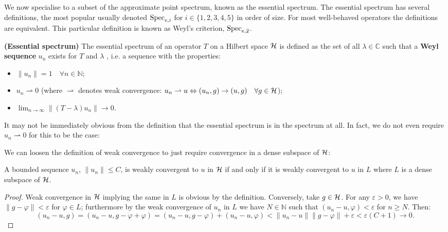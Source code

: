 \documentclass[../main.tex]{subfiles}
\begin{document}
We now specialise to a subset of the approximate point spectrum, known as the essential spectrum.
The essential spectrum has several definitions, 
the most popular usually denoted $\mathrm{Spec}_{e,i}$ for $i \in \{1,2,3,4,5\}$ in order of size. For 
most well-behaved operators the definitions are equivalent. This particular definition 
is known as Weyl's criterion, $\mathrm{Spec}_{e, 2}$. \cite{edmunds2018spectral}

\begin{definition}{\textbf{(Essential spectrum)}}
The essential spectrum of an operator $T$ on a Hilbert space $\mathcal{H}$ 
is defined as the set of all $\lambda \in \mathbb{C}$ such that a \textbf{Weyl sequence} $u_n$ exists for $T$ and $\lambda$ , i.e. a sequence with the properties:
\begin{itemize}
\item $\|u_n\| = 1\quad \forall n \in \mathbb{N}$;
\item $u_n \rightharpoonup 0$ (where $\rightharpoonup$ denotes weak convergence: $u_n \rightharpoonup u \Leftrightarrow (u_n, g) \rightarrow (u, g) \quad \forall g \in \mathcal{H}$);
\item $\lim_{n \rightarrow \infty}\|(T - \lambda)u_n\|  \rightarrow 0$.
\end{itemize}
\end{definition}

It may not be immediately obvious from the definition that the essential spectrum is in the spectrum at all. In fact, we do not even require $u_n \rightharpoonup 0$ for this to be the case:



We can loosen the definition of weak convergence to just require convergence in a dense subspace of $\mathcal{H}$:
\begin{lemma}\label{thm:weak-conv-dense-subset}
A bounded sequence $u_n$, $\|u_n\| \leq C$, is weakly convergent to $u$ in $\mathcal{H}$ if and only if it is weakly convergent to $u$ in $L$ where $L$ is a dense subspace of $\mathcal{H}$.
\end{lemma}
\begin{proof}
Weak convergence in $\mathcal{H}$ implying the same in $L$ is obvious by the definition. 
Conversely, take $g \in \mathcal{H}$. For any $\varepsilon > 0$, we have $\|g - \varphi\| < \varepsilon$ for $\varphi \in L$; furthermore by the weak convergence of $u_n$ in $L$ we have $N \in \mathbb{N}$ such that $(u_n - u, \varphi) < \varepsilon$ for $n \geq N$. Then:
$$( u_n - u, g ) = ( u_n - u, g - \varphi + \varphi ) = ( u_n - u, g - \varphi ) + ( u_n - u, \varphi ) < \|u_n - u\| \|g - \varphi\| + \varepsilon < \varepsilon(C + 1) \rightarrow 0.$$
\end{proof}
\end{document}
